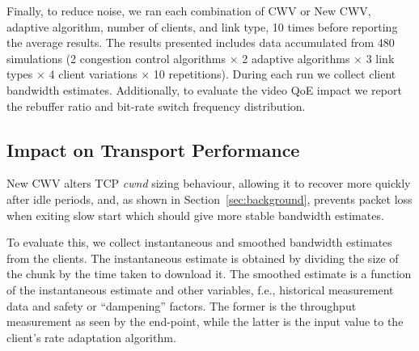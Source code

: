 \documentclass[10pt, acmlarge]{acmart}
\begin{document}
Finally, to reduce noise, we ran each combination of CWV or New CWV, adaptive algorithm,
number of clients, and link type, 10 times before reporting the average results.
The results presented includes data accumulated from 480 simulations 
(2 congestion control algorithms $\times$ 2 adaptive algorithms $\times$ 3 link 
types $\times$ 4 client variations $\times$ 10 repetitions). 
During each run we collect client bandwidth estimates. Additionally, to evaluate the video 
QoE impact we report the rebuffer ratio and bit-rate switch frequency distribution.

\subsection{Impact on Transport Performance} 
\label{sec:transport-impact}

New CWV alters TCP \emph{cwnd} sizing behaviour, allowing it to recover more quickly 
after idle periods, and, as shown in Section~\ref{sec:background}, prevents packet loss 
when exiting slow start which should give more stable bandwidth estimates. 

To evaluate this, we collect instantaneous and smoothed bandwidth estimates from the clients.
The instantaneous estimate is obtained by dividing the size of the chunk by the time 
taken to download it. The smoothed estimate is a function of the instantaneous estimate and 
other variables, f.e., historical measurement data and safety or ``dampening'' factors.
The former is the throughput measurement as seen by the end-point, while the latter 
is the input value to the client's rate adaptation algorithm.
\end{document}
